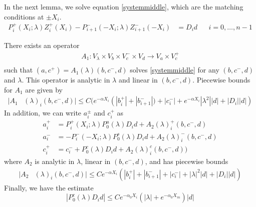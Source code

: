\documentclass[thesis.tex]{subfiles}
\begin{document}
In the next lemma, we solve equation \eqref{systemmiddle}, which are the matching conditions at $\pm X_i$.
\begin{align*}
P_i^+(X_i; \lambda) Z_i^+(X_i) - P_{i+1}^-(-X_i; \lambda) Z_{i+1}^-(-X_i) &= D_i d && i = 0, \dots, n-1
\end{align*}

\begin{lemma}\label{Zinv1}
There exists an operator
\begin{align*}
A_1: V_\lambda \times V_b \times V_c^- \times V_d \rightarrow V_a \times V_c^+\\
\end{align*}
such that $(a, c^+) = A_1(\lambda)(b, c^-,d)$ solves \eqref{systemmiddle} for any $(b, c^-,d)$ and $\lambda$. This operator is analytic in $\lambda$ and linear in $(b,c^-,d)$. Piecewise bounds for $A_1$ are given by
\begin{align}\label{A1bound}
|A_1&(\lambda)_i(b, c^-, d)|
\leq C \Big( e^{-\alpha X_i} \left( |b_i^+| + |b_{i+1}^-|) + |c_i^-| + e^{-\alpha X_i} |\lambda^2||d| + |D_i||d| \right)
\end{align} 
In addition, we can write $a_i^\pm$ and $c_i^+$ as 
\begin{align*}
a_i^+ &= P_i^+(X_i; \lambda) P_0^u(\lambda) D_i d + A_2(\lambda)_i^+(b, c^-, d) \\
a_i^- &= -P_i^-(-X_i; \lambda) P_0^s(\lambda) D_i d + A_2(\lambda)_i^-(b, c^-, d) \\
c_i^+ &= c_i^- + P_0^c(\lambda) D_i d + A_2(\lambda)_i^c(b, c^-, d) )
\end{align*}
where $A_2$ is analytic in $\lambda$, linear in $(b, c^-, d)$, and has piecewise bounds
\begin{align}\label{A2bound}
|A_2&(\lambda)_i(b, c^-, d)|
\leq C e^{-\alpha X_i} \left( |b_i^+| + |b_{i+1}^-| + |c_i^-| + |\lambda|^2|d| + |D_i||d| \right)
\end{align}
Finally, we have the estimate
\begin{equation}\label{P0cDid}
|P_0^c(\lambda) D_i d| \leq C e^{-\alpha_0 X_i}(|\lambda| + e^{-\alpha_0 X_m})|d|
\end{equation}


\end{lemma}
\end{document}
